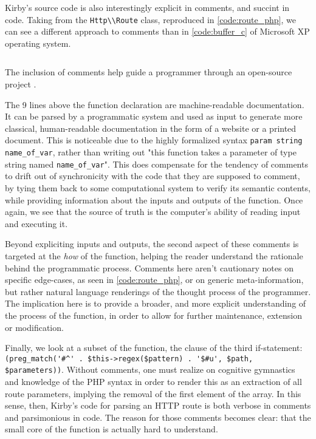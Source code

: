 Kirby's source code is also interestingly explicit in comments, and succint in code. Taking from the \lstinline{Http\\Route} class, reproduced in \ref{code:route_php}, we can see a different approach to comments than in \ref{code:buffer_c} of Microsoft XP operating system.

\begin{listing}
  \inputminted{php}{./corpus/route.php}
  \caption{The inclusion of comments help guide a programmer through an open-source project \citep{allgeier_route_2021}.}
  \label{code:route_php}
\end{listing}

The 9 lines above the function declaration are machine-readable documentation. It can be parsed by a programmatic system and used as input to generate more classical, human-readable documentation in the form of a website or a printed document. This is noticeable due to the highly formalized syntax \lstinline{param string name_of_var}, rather than writing out "this function takes a parameter of type string named \lstinline{name_of_var}". This does compensate for the tendency of comments to drift out of synchronicity with the code that they are supposed to comment, by tying them back to some computational system to verify its semantic contents, while providing information about the inputs and outputs of the function. Once again, we see that the source of truth is the computer's ability of reading input and executing it.

Beyond expliciting inputs and outputs, the second aspect of these comments is targeted at the \emph{how} of the function, helping the reader understand the rationale behind the programmatic process. Comments here aren't cautionary notes on specific edge-cases, as seen in \ref{code:route_php}, or on generic meta-information, but rather natural language renderings of the thought process of the programmer. The implication here is to provide a broader, and more explicit understanding of the process of the function, in order to allow for further maintenance, extension or modification.

Finally, we look at a subset of the function, the clause of the third if-statement: \lstinline{(preg_match('#^' . $this->regex($pattern) . '$#u', $path, $parameters))}. Without comments, one must realize on cognitive gymnastics and knowledge of the PHP syntax in order to render this as an extraction of all route parameters, implying the removal of the first element of the array. In this sense, then, Kirby's code for parsing an HTTP route is both verbose in comments and parsimonious in code. The reason for those comments becomes clear: that the small core of the function is actually hard to understand.

